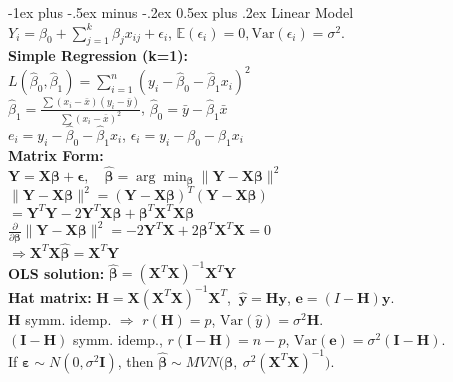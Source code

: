 \documentclass[10pt,landscape]{article}
\makeatletter
\renewcommand{\subsection}{\@startsection{subsection}{2}{0mm}%
                                {-1ex plus -.5ex minus -.2ex}%
                                {0.5ex plus .2ex}%
                                {\normalfont\small\bfseries}}
\makeatother
\begin{document}
\begin{multicols}{3}
\subsection{Linear Model}
$Y_i = \beta_0 + \sum_{j=1}^k \beta_j x_{ij} + \epsilon_i$, \quad $\mathbb{E}(\epsilon_i)=0, \mathrm{Var}(\epsilon_i)=\sigma^2$.\\
\medskip
\textbf{Simple Regression (k=1):}\\
$L(\hat{\beta}_0,\hat{\beta}_1) = \sum_{i=1}^n (y_i - \hat{\beta}_0 - \hat{\beta}_1 x_i)^2$\\
$\hat{\beta}_1 = \frac{\sum (x_i - \bar{x})(y_i - \bar{y})}{\sum (x_i - \bar{x})^2}$,\quad
$\hat{\beta}_0 = \bar{y} - \hat{\beta}_1 \bar{x}$\\
$e_i = y_i - \hat{\beta}_0 - \hat{\beta}_1 x_i$,\quad
$\epsilon_i = y_i - \beta_0 - \beta_1 x_i$\\[4pt]
\medskip
\textbf{Matrix Form:}\\
$\mathbf{Y} = \mathbf{X}\boldsymbol{\beta} + \boldsymbol{\epsilon},\quad \hat{\boldsymbol{\beta}} = \arg\min_{\boldsymbol{\beta}} \|\mathbf{Y} - \mathbf{X}\boldsymbol{\beta}\|^2$\\[2pt]
$\|\mathbf{Y} - \mathbf{X}\boldsymbol{\beta}\|^2 = (\mathbf{Y} - \mathbf{X}\boldsymbol{\beta})^T(\mathbf{Y} - \mathbf{X}\boldsymbol{\beta})$\\
$= \mathbf{Y}^T \mathbf{Y} - 2\mathbf{Y}^T\mathbf{X}\boldsymbol{\beta} + \boldsymbol{\beta}^T \mathbf{X}^T \mathbf{X} \boldsymbol{\beta}$\\
$\frac{\partial}{\partial\boldsymbol{\beta}} \|\mathbf{Y} - \mathbf{X}\boldsymbol{\beta}\|^2 = - 2\mathbf{Y}^T \mathbf{X} + 2\boldsymbol{\beta}^T \mathbf{X}^T \mathbf{X} = 0$\\
$\Rightarrow \mathbf{X}^T \mathbf{X} \hat{\boldsymbol{\beta}} = \mathbf{X}^T \mathbf{Y}$\\[2pt]
\textbf{OLS solution:} $\hat{\boldsymbol{\beta}} = (\mathbf{X}^T \mathbf{X})^{-1}\mathbf{X}^T \mathbf{Y}$\\
\medskip
\textbf{Hat matrix:} $\mathbf{H} = \mathbf{X}(\mathbf{X}^T \mathbf{X})^{-1}\mathbf{X}^T$, $\ \mathbf{\hat y} = \mathbf{H}\mathbf {y}$, $\mathbf{e} = (I-\mathbf{H})\mathbf{y}$.\\
$\mathbf{H}$ symm. idemp. $\Rightarrow$ $r(\mathbf{H}) = p$, $\mathrm{Var}(\hat y) = \sigma^2 \mathbf{H}$.\\
$(\mathbf{I}-\mathbf{H})$ symm. idemp., $r(\mathbf{I}-\mathbf{H}) = n-p$, $\mathrm{Var}(\mathbf{e}) = \sigma^2(\mathbf{I}-\mathbf{H})$.\\
\medskip
If $\boldsymbol\varepsilon \sim N(0,\sigma^2 \mathbf{I})$, then $\hat{\boldsymbol{\beta}} \sim MVN\big(\boldsymbol{\beta},\ \sigma^2 (\mathbf{X}^T \mathbf{X})^{-1}\big)$.\\
\medskip

\end{multicols}
\end{document}
